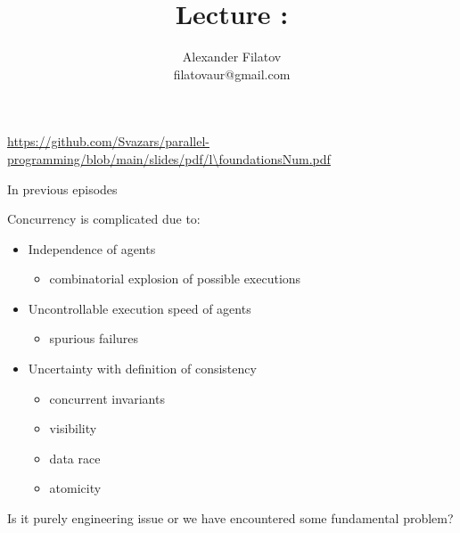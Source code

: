 


\newcommand{\thisLectureNum}{\foundationsNum}

\title[]{Lecture \thisLectureNum: \foundationsTopic}
\subtitle[]{\foundationsKey}
\author[]{Alexander Filatov\\ filatovaur@gmail.com}

\date{}



\begin{frame}
  \titlepage
  \url{https://github.com/Svazars/parallel-programming/blob/main/slides/pdf/l\thisLectureNum.pdf}
\end{frame}

\begin{frame}{In previous episodes}

Concurrency is complicated due to:
\begin{itemize}
  \item Independence of agents 
  \begin{itemize}
    \item combinatorial explosion of possible executions
  \end{itemize}
  \item Uncontrollable execution speed of agents 
  \begin{itemize}
    \item spurious failures
  \end{itemize}  
  \item Uncertainty with definition of consistency 
  \begin{itemize}
    \item concurrent invariants
    \item visibility
    \item data race
    \item atomicity
  \end{itemize}  
\end{itemize}

\pause

Is it purely engineering issue or we have encountered some fundamental problem?

\end{frame}



